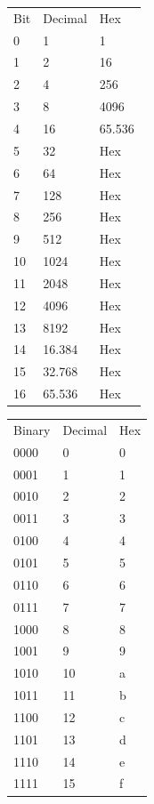 \documentclass[12pt,landscape,a4paper]{article}
\begin{document}
\raggedright
\footnotesize
\begin{multicols}{4}

\begin{minipage}[t]{\linewidth}
\begin{tabular}{l | l | l}
    Bit & Decimal & Hex \\
    0 & 1 & 1 \\
    1 & 2 & 16 \\
    2 & 4 & 256 \\
    3 & 8 & 4096 \\
    4 & 16 & 65.536 \\
    5 & 32 & Hex \\
    6 & 64 & Hex \\
    7 & 128 & Hex \\
    8 & 256 & Hex \\
    9 & 512 & Hex \\
    10 & 1024 & Hex \\
    11 & 2048 & Hex \\
    12 & 4096 & Hex \\
    13 & 8192 & Hex \\
    14 & 16.384 & Hex \\
    15 & 32.768 & Hex \\
    16 & 65.536 & Hex \\
\end{tabular}

\begin{tabular}{l | l | l}
    Binary & Decimal & Hex \\
    0000 & 0 & 0 \\
    0001 & 1 & 1 \\
    0010 & 2 & 2 \\
    0011 & 3 & 3 \\
    0100 & 4 & 4 \\
    0101 & 5 & 5 \\
    0110 & 6 & 6 \\
    0111 & 7 & 7 \\
    1000 & 8 & 8 \\
    1001 & 9 & 9 \\
    1010 & 10 & a \\
    1011 & 11 & b \\
    1100 & 12 & c \\
    1101 & 13 & d \\
    1110 & 14 & e \\
    1111 & 15 & f \\
\end{tabular}


\end{minipage}
\end{multicols}
\end{document}
